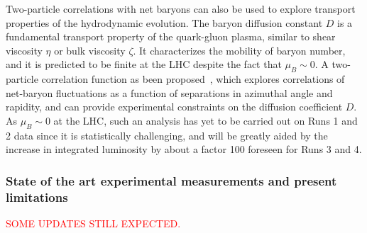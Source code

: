 Two-particle correlations with net baryons can also be used to explore transport properties of the hydrodynamic evolution. The baryon diffusion constant $D$ is a fundamental transport property of the quark-gluon plasma, similar to shear viscosity $\eta$ or bulk viscosity $\zeta$. It characterizes the mobility of baryon number, and it is predicted to be finite at the LHC despite the fact that $\mu_{B}\sim0$. A two-particle correlation function as been proposed~\cite{Floerchinger:2015efa}, which explores correlations of net-baryon fluctuations as a function of separations in azimuthal angle and rapidity, and can provide experimental constraints on the diffusion coefficient $D$. As $\mu_{B}\sim0$ at the LHC, such an analysis has yet to be carried out on Runs 1 and 2 data since it is statistically challenging, and will be greatly aided by the increase in \PbPb integrated luminosity by about a factor 100 foreseen for Runs 3 and 4.

\subsubsection{State of the art experimental measurements and present limitations}
\textcolor{red}{SOME UPDATES STILL EXPECTED.}

